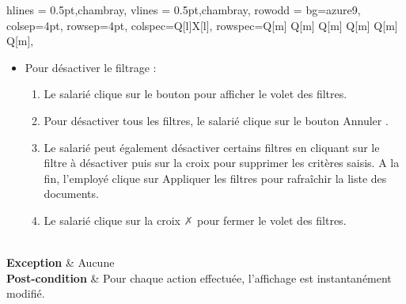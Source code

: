 \begin{longtblr}[caption={Description textuelle du cas d’utilisation « Gérer l'affichage des documents »}, , note{3} = {Les filtres actifs s’affichent au-dessus de la section \textbf{Détail du répertoire}.}]{
    hlines = {0.5pt,chambray},
    vlines = {0.5pt,chambray},
    row{odd} = {bg=azure9},
    colsep=4pt,
    rowsep=4pt,
    colspec={Q[l]X[l]},
    rowspec={Q[m] Q[m] Q[m] Q[m] Q[m] Q[m]},
}
\begin{minipage}{\linewidth}
\begin{itemize}[leftmargin=*]
\begin{enumerate}
        \item Le salarié clique sur le bouton .
        \item Parmi les 5 filtres proposés, le salarié clique sur les filtres souhaités. 
        \item Dans le champ qui s’affiche, le salarié renseigne les critères de filtrage.
        \item Le salarié clique  sur .
        \item Le salarié clique sur la croix \textcolor{gray}{\faClose} pour fermer le volet des filtres.
    \end{enumerate}
    \item Pour désactiver le filtrage :
    \begin{enumerate}
        \item Le salarié clique sur le bouton  pour afficher le volet des filtres.
        \item Pour désactiver tous les filtres, le salarié clique sur le bouton Annuler .
        \item Le salarié peut également désactiver certains filtres en cliquant sur le filtre à désactiver puis sur la croix  pour supprimer les critères saisis.
A la fin, l'employé clique sur Appliquer les filtres pour rafraîchir la liste des documents.
\item Le salarié clique sur la croix \textcolor{gray}{\faClose} pour fermer le volet des filtres.
    \end{enumerate}
\end{itemize}
\end{minipage}
\\
\textbf{Exception} & Aucune
\\
\textbf{Post-condition} & 
Pour chaque action effectuée, l’affichage est instantanément modifié.
\end{longtblr}

